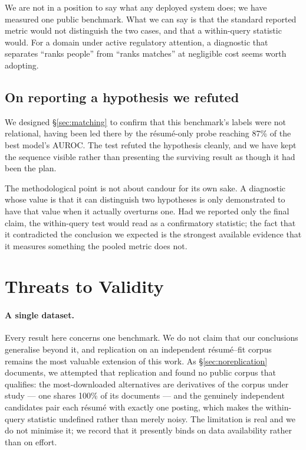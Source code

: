 \documentclass[11pt]{article}                      %
\begin{document}
We are not in a position to say what any deployed system does; we have measured
one public benchmark. What we can say is that the standard reported metric would
not distinguish the two cases, and that a within-query statistic would. For a
domain under active regulatory attention, a diagnostic that separates ``ranks
people'' from ``ranks matches'' at negligible cost seems worth adopting.

\subsection{On reporting a hypothesis we refuted}

We designed \S\ref{sec:matching} to confirm that this benchmark's labels were not
relational, having been led there by the résumé-only probe reaching 87\% of the
best model's AUROC. The test refuted the hypothesis cleanly, and we have kept the
sequence visible rather than presenting the surviving result as though it had
been the plan.

The methodological point is not about candour for its own sake. A diagnostic
whose value is that it can distinguish two hypotheses is only demonstrated to
have that value when it actually overturns one. Had we reported only the final
claim, the within-query test would read as a confirmatory statistic; the fact
that it contradicted the conclusion we expected is the strongest available
evidence that it measures something the pooled metric does not.

\section{Threats to Validity}
\label{sec:threats}

\paragraph{A single dataset.}
Every result here concerns one benchmark. We do not claim that our conclusions
generalise beyond it, and replication on an independent résumé--fit corpus
remains the most valuable extension of this work. As \S\ref{sec:noreplication}
documents, we attempted that replication and found no public corpus that
qualifies: the most-downloaded alternatives are derivatives of the corpus under
study --- one shares 100\% of its documents --- and the genuinely independent
candidates pair each résumé with exactly one posting, which makes the
within-query statistic undefined rather than merely noisy. The limitation is real
and we do not minimise it; we record that it presently binds on data availability
rather than on effort.
\end{document}
